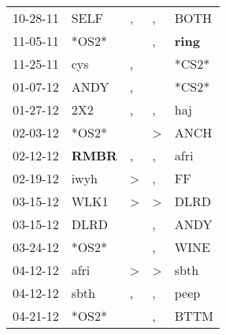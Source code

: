 \begin{supertabular}{p{0.07\textwidth}p{0.06\textwidth}p{0.02\textwidth}p{0.02\textwidth}p{0.06\textwidth}}
          10-28-11\textsuperscript{} &           SELF\textsuperscript{} &                , &                , &           BOTH\textsuperscript{} \\
          11-05-11\textsuperscript{} &                            *OS2* &                  &                , &  \textbf{ring\textsuperscript{}} \\
          11-25-11\textsuperscript{} &            cys\textsuperscript{} &                , &                  &                            *CS2* \\
          01-07-12\textsuperscript{} &           ANDY\textsuperscript{} &                , &                  &                            *CS2* \\
          01-27-12\textsuperscript{} &            2X2\textsuperscript{} &                , &                , &            haj\textsuperscript{} \\
          02-03-12\textsuperscript{} &                            *OS2* &                  &     \textgreater &           ANCH\textsuperscript{} \\
          02-12-12\textsuperscript{} &  \textbf{RMBR\textsuperscript{}} &                , &                , &           afri\textsuperscript{} \\
          02-19-12\textsuperscript{} &           iwyh\textsuperscript{} &     \textgreater &                , &             FF\textsuperscript{} \\
          03-15-12\textsuperscript{} &           WLK1\textsuperscript{} &     \textgreater &     \textgreater &           DLRD\textsuperscript{} \\
          03-15-12\textsuperscript{} &           DLRD\textsuperscript{} &                  &                , &           ANDY\textsuperscript{} \\
          03-24-12\textsuperscript{} &                            *OS2* &                  &                , &           WINE\textsuperscript{} \\
          04-12-12\textsuperscript{} &           afri\textsuperscript{} &     \textgreater &     \textgreater &           sbth\textsuperscript{} \\
          04-12-12\textsuperscript{} &           sbth\textsuperscript{} &                , &                , &           peep\textsuperscript{} \\
          04-21-12\textsuperscript{} &                            *OS2* &                  &                , &           BTTM\textsuperscript{} \\

\end{supertabular}
